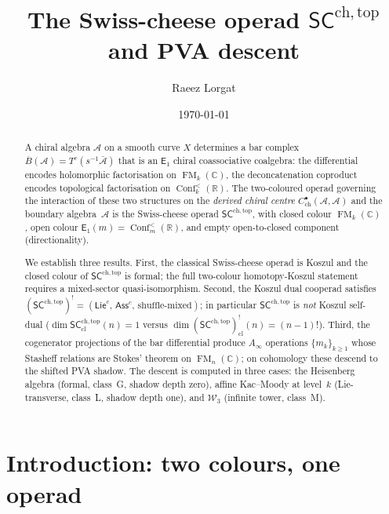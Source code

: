 \documentclass[11pt,reqno]{amsart}
\theoremstyle{definition}
\theoremstyle{remark}
\newcommand{\cA}{\mathcal{A}}
\newcommand{\cW}{\mathcal{W}}
\newcommand{\CC}{\mathbb{C}}
\newcommand{\RR}{\mathbb{R}}
\newcommand{\barB}{\overline{B}}
\newcommand{\barA}{\bar{\cA}}
\newcommand{\Ainf}{A_{\infty}}
\newcommand{\Eone}{\mathsf{E}_{1}}
\newcommand{\SCchtop}{\mathsf{SC}^{\mathrm{ch,top}}}
\newcommand{\Ass}{\mathsf{Ass}}
\newcommand{\Lie}{\mathsf{Lie}}
\DeclareMathOperator{\Conf}{Conf}
\DeclareMathOperator{\FM}{FM}
\numberwithin{equation}{section}
\begin{document}
\title[SC$^{\mathrm{ch,top}}$ and PVA descent]
{The Swiss-cheese operad $\SCchtop$ and PVA descent}

\author{Raeez Lorgat}
\address{Perimeter Institute for Theoretical Physics,
  Waterloo, ON N2L 2Y5, Canada \\
  Department of Physics, University of Waterloo,
  Waterloo, ON N2L 3G1, Canada}

\date{\today}

\begin{abstract}
A chiral algebra $\cA$ on a smooth curve $X$ determines a bar
complex $\barB(\cA) = T^c(s^{-1}\barA)$ that is an $\Eone$
chiral coassociative coalgebra: the differential encodes
holomorphic factorisation on $\FM_k(\CC)$, the deconcatenation
coproduct encodes topological factorisation on
$\Conf_k^{<}(\RR)$.  The two-coloured operad governing the
interaction of these two structures on the \emph{derived chiral
centre} $C^\bullet_{\mathrm{ch}}(\cA,\cA)$ and the boundary
algebra~$\cA$ is the Swiss-cheese operad
$\SCchtop$, with closed colour $\FM_k(\CC)$, open colour
$\Eone(m) = \Conf_m^{<}(\RR)$, and empty open-to-closed
component (directionality).

We establish three results.
First, the classical Swiss-cheese operad is Koszul and the closed
colour of $\SCchtop$ is formal; the full two-colour homotopy-Koszul
statement requires a mixed-sector quasi-isomorphism.
Second, the Koszul dual cooperad satisfies
$(\SCchtop)^! = (\Lie^c,\,\Ass^c,\,\text{shuffle-mixed})$;
in particular $\SCchtop$ is \emph{not} Koszul self-dual
($\dim\SCchtop_{\mathrm{cl}}(n) = 1$ versus
$\dim(\SCchtop)^!_{\mathrm{cl}}(n) = (n-1)!$).
Third, the cogenerator projections of the bar differential
produce $\Ainf$ operations $\{m_k\}_{k \geq 1}$ whose Stasheff
relations are Stokes' theorem on $\FM_n(\CC)$; on cohomology
these descend to the shifted PVA shadow.
The descent is computed in three cases:
the Heisenberg algebra (formal, class~G, shadow depth zero),
affine Kac--Moody at level~$k$ (Lie-transverse, class~L, shadow
depth one), and $\cW_3$ (infinite tower, class~M).
\end{abstract}

\maketitle
\tableofcontents


\section{Introduction: two colours, one operad}
\label{sec:introduction}
\end{document}
